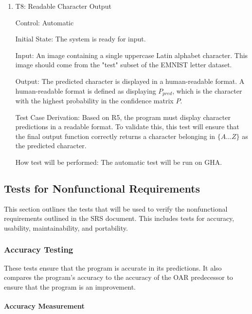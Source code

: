 \documentclass[12pt, titlepage]{article}
\begin{document}
\begin{enumerate}

\item{T8: Readable Character Output\\}

Control: Automatic

Initial State: The \progname{} system is ready for input.

Input: An image containing a single uppercase Latin alphabet character. This
image should come from the "test" subset of the EMNIST letter dataset.

Output: The predicted character is displayed in a human-readable format.
A human-readable format is defined as displaying $P_{pred}$, which is the
character with the highest probability in the confidence matrix $P$.

Test Case Derivation: Based on R5, the program must display character
predictions in a readable format. To validate this, this test will ensure
that the final output function correctly returns a character belonging in
${\{A...Z\}}$ as the predicted character.

How test will be performed: The automatic test will be run on GHA.

\end{enumerate}

\subsection{Tests for Nonfunctional Requirements}

This section outlines the tests that will be used to verify the nonfunctional
requirements outlined in the SRS document. This includes tests for accuracy,
usability, maintainability, and portability.

\subsubsection{Accuracy Testing}

These tests ensure that the program is accurate in its predictions. It also
compares the program's accuracy to the accuracy of the OAR predecessor to
ensure that the program is an improvement.

\paragraph{Accuracy Measurement}
\end{document}
